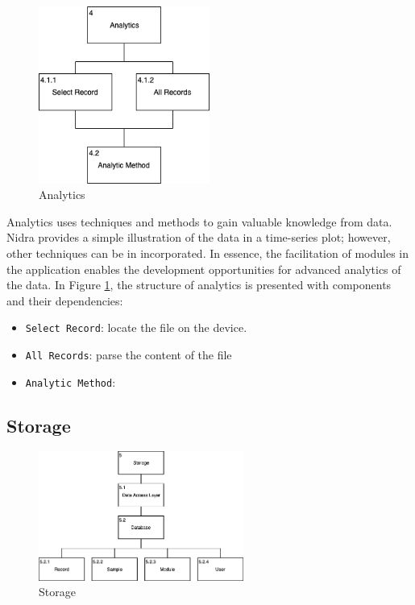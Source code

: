 \begin{figure}
    \centering
    \includegraphics[width=0.5\textwidth]{images/Analytics.png}
    \caption{Analytics}
    \label{fig:hta_analytics}
\end{figure}

Analytics uses techniques and methods to gain valuable knowledge from data. Nidra provides a simple illustration of the data in a time-series plot; however, other techniques can be in incorporated. In essence, the facilitation of modules in the application enables the development opportunities for advanced analytics of the data. In Figure \ref{fig:hta_analytics}, the structure of analytics is presented with components and their dependencies: 

\begin{itemize}
    \item[4.1.1] \verb|Select Record|: locate the file on the device.
    \item[4.1.2] \verb|All Records|: parse the content of the file 
    \item[4.2] \verb|Analytic Method|: 
\end{itemize}

\subsection{Storage}

\begin{figure}
    \centering
    \includegraphics[width=0.6\textwidth]{images/Storage.png}
    \caption{Storage}
    \label{fig:hta_storage}
\end{figure}

